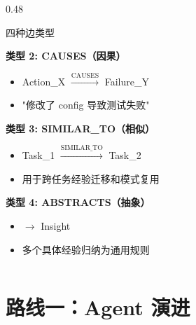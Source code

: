 \documentclass[aspectratio=169,10pt]{beamer}
\begin{document}
\begin{frame}
\begin{columns}[T]
\begin{column}{0.48\textwidth}
\begin{block}{四种边类型}
        \vspace{0.2cm}

        \textbf{类型 2: CAUSES（因果）}
        \begin{itemize}
          \item Action\_X $\xrightarrow{\text{CAUSES}}$ Failure\_Y
          \item "修改了 config 导致测试失败"
        \end{itemize}

        \vspace{0.2cm}

        \textbf{类型 3: SIMILAR\_TO（相似）}
        \begin{itemize}
          \item Task\_1 $\xrightarrow{\text{SIMILAR\_TO}}$ Task\_2
          \item 用于跨任务经验迁移和模式复用
        \end{itemize}

        \vspace{0.2cm}

        \textbf{类型 4: ABSTRACTS（抽象）}
        \begin{itemize}
          \item [Action\_1, Action\_2, ...] $\rightarrow$ Insight
          \item 多个具体经验归纳为通用规则
        \end{itemize}
      \end{block}
    \end{column}
  \end{columns}
\end{frame}

\section{路线一：Agent 演进}
\end{document}
